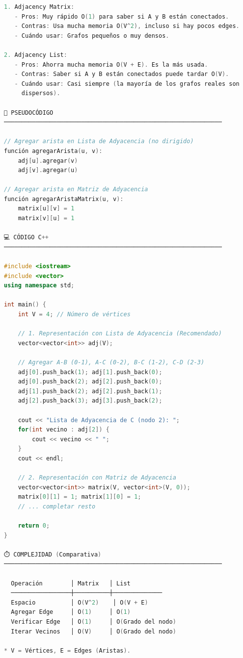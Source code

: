 \documentclass{article}
\begin{document}
\begin{lstlisting}[language=C++]
1. Adjacency Matrix:
   - Pros: Muy rápido O(1) para saber si A y B están conectados.
   - Contras: Usa mucha memoria O(V^2), incluso si hay pocos edges.
   - Cuándo usar: Grafos pequeños o muy densos.

2. Adjacency List:
   - Pros: Ahorra mucha memoria O(V + E). Es la más usada.
   - Contras: Saber si A y B están conectados puede tardar O(V).
   - Cuándo usar: Casi siempre (la mayoría de los grafos reales son
     dispersos).

📝 PSEUDOCÓDIGO
──────────────────────────────────────────────────────────────

// Agregar arista en Lista de Adyacencia (no dirigido)
función agregarArista(u, v):
    adj[u].agregar(v)
    adj[v].agregar(u)

// Agregar arista en Matriz de Adyacencia
función agregarAristaMatrix(u, v):
    matrix[u][v] = 1
    matrix[v][u] = 1

💻 CÓDIGO C++
──────────────────────────────────────────────────────────────

#include <iostream>
#include <vector>
using namespace std;

int main() {
    int V = 4; // Número de vértices
    
    // 1. Representación con Lista de Adyacencia (Recomendado)
    vector<vector<int>> adj(V);

    // Agregar A-B (0-1), A-C (0-2), B-C (1-2), C-D (2-3)
    adj[0].push_back(1); adj[1].push_back(0);
    adj[0].push_back(2); adj[2].push_back(0);
    adj[1].push_back(2); adj[2].push_back(1);
    adj[2].push_back(3); adj[3].push_back(2);

    cout << "Lista de Adyacencia de C (nodo 2): ";
    for(int vecino : adj[2]) {
        cout << vecino << " ";
    }
    cout << endl;

    // 2. Representación con Matriz de Adyacencia
    vector<vector<int>> matrix(V, vector<int>(V, 0));
    matrix[0][1] = 1; matrix[1][0] = 1;
    // ... completar resto

    return 0;
}

⏱️ COMPLEJIDAD (Comparativa)
──────────────────────────────────────────────────────────────

  Operación        │ Matrix   │ List
  ─────────────────┼──────────┼──────────────
  Espacio          │ O(V^2)    │ O(V + E)
  Agregar Edge     │ O(1)     │ O(1)
  Verificar Edge   │ O(1)     │ O(Grado del nodo)
  Iterar Vecinos   │ O(V)     │ O(Grado del nodo)

* V = Vértices, E = Edges (Aristas).
\end{lstlisting}
\end{document}
